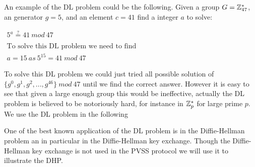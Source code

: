 \noindent
An example of the DL problem could be the following. Given a group $G = \mathbb{Z}_{47}^*$, an generator $g=5$, and an element $c = 41$ find a integer $a$ to solve: 

\begin{center}
$
\begin{array}{l}
     5^a \stackrel{?}{=} 41 \ mod \ 47 \\
     \\
     \text{To solve this DL problem we need to find} \\
     a = 15 \ as \ 5^{15} = 41 \ mod \ 47
\end{array}
$
\end{center}

\noindent
To solve this DL problem we could just tried all possible solution of \\
$ \{g^0, g^1, g^2,...,g^{46}\} \ mod \ 47$ until we find the correct answer. However it is easy to see that given a large enough group this would be ineffective, actually the DL problem is believed to be notoriously hard, for instance in $\mathbb{Z}_p^*$ for large prime $p$. \\

\noindent
We use the DL problem in the following

\iffalse
    \begin{defi}[Computational Diffie-Hellman (CDH) problem]
    \begin{math}g\in\Z_p, \ g\neq1 \end{math}\\
    Given \begin{math}(g,g^a,g^b)\end{math} find(compute)  \begin{math}(g^{a*b})\end{math} is hard problem.\\
    Definition: Need a reference?? \\
    \textcolor{red}{Kasper}
    \end{defi}
\fi

One of the best known application of the DL problem is in the Diffie-Hellman problem an in particular in the Diffie-Hellman key exchange. Though the Diffie-Hellman key exchange is not used in the PVSS protocol we will use it to illustrate the DHP.



